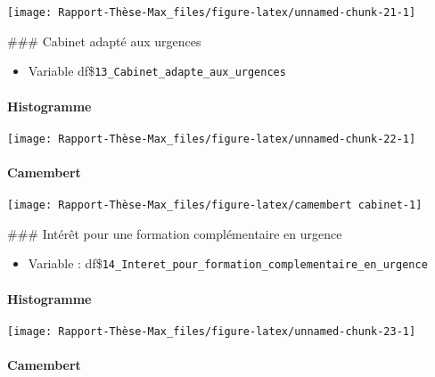\documentclass[
]{article}
\providecommand{\tightlist}{%
  \setlength{\itemsep}{0pt}\setlength{\parskip}{0pt}}
\begin{document}
\begin{center}\texttt{[image: Rapport-Thèse-Max\_files/figure-latex/unnamed-chunk-21-1]} \end{center}

\hfill\break
\hfill\break
\#\#\# Cabinet adapté aux urgences

\begin{itemize}
\tightlist
\item
  Variable df\$\texttt{13\_Cabinet\_adapte\_aux\_urgences}
\end{itemize}

\paragraph{Histogramme}\label{histogramme-2}

\begin{center}\texttt{[image: Rapport-Thèse-Max\_files/figure-latex/unnamed-chunk-22-1]} \end{center}

\paragraph{Camembert}\label{camembert-2}

\begin{center}\texttt{[image: Rapport-Thèse-Max\_files/figure-latex/camembert cabinet-1]} \end{center}

\hfill\break
\hfill\break
\hfill\break
\hfill\break
\#\#\# Intérêt pour une formation complémentaire en urgence

\begin{itemize}
\tightlist
\item
  Variable :
  df\$\texttt{14\_Interet\_pour\_formation\_complementaire\_en\_urgence}
\end{itemize}

\paragraph{Histogramme}\label{histogramme-3}

\begin{center}\texttt{[image: Rapport-Thèse-Max\_files/figure-latex/unnamed-chunk-23-1]} \end{center}

\paragraph{Camembert}\label{camembert-3}
\end{document}

